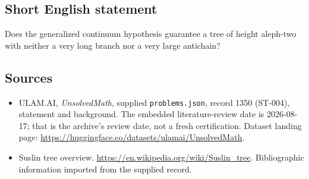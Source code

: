 \documentclass[11pt,a4paper]{article}
\begin{document}
\subsection{Short English statement}

Does the generalized continuum hypothesis guarantee a tree of height aleph-two with neither a very long branch nor a very large antichain?

\subsection{Sources}

{\small

\begin{itemize}

\item[\hypertarget{source:1350:1}{S1}] ULAM.AI, \emph{UnsolvedMath}, supplied \texttt{problems.json}, record 1350 (ST-004), statement and background. The embedded literature-review date is 2026-08-17; that is the archive’s review date, not a fresh certification. Dataset landing page: \url{https://huggingface.co/datasets/ulamai/UnsolvedMath}.

\item[\hypertarget{source:1350:2}{S2}] Suslin tree overview. \url{https://en.wikipedia.org/wiki/Suslin_tree}. Bibliographic information imported from the supplied record.

\end{itemize}

}

\label{end:1350}
\end{document}
